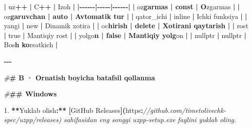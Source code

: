 \documentclass[a4paper,11pt,twoside,openright]{book}
\newenvironment{Shaded}{\begin{snugshade}}{\end{snugshade}}
\newcommand{\CharTok}[1]{\textcolor[rgb]{0.31,0.60,0.02}{#1}}
\newcommand{\CommentTok}[1]{\textcolor[rgb]{0.56,0.35,0.01}{\textit{#1}}}
\newcommand{\ErrorTok}[1]{\textcolor[rgb]{0.64,0.00,0.00}{\textbf{#1}}}
\newcommand{\FloatTok}[1]{\textcolor[rgb]{0.00,0.00,0.81}{#1}}
\newcommand{\NormalTok}[1]{#1}
\newcommand{\OperatorTok}[1]{\textcolor[rgb]{0.81,0.36,0.00}{\textbf{#1}}}
\newcommand{\PreprocessorTok}[1]{\textcolor[rgb]{0.56,0.35,0.01}{\textit{#1}}}
\begin{document}
\begin{Shaded}
\begin{Highlighting}[]
\OperatorTok{|}\NormalTok{ uz}\OperatorTok{++} \OperatorTok{|}\NormalTok{ C}\OperatorTok{++} \OperatorTok{|}\NormalTok{ Izoh }\OperatorTok{|}
\OperatorTok{|{-}{-}{-}{-}{-}{-}|{-}{-}{-}{-}{-}|{-}{-}{-}{-}{-}{-}|}
\OperatorTok{|} \ErrorTok{\textasciigrave{}}\NormalTok{o}\CharTok{\textquotesingle{}z}\ErrorTok{garmas\textasciigrave{} | \textasciigrave{}const\textasciigrave{} | O}\CharTok{\textquotesingle{}}\NormalTok{zgarmas }\OperatorTok{|}
\OperatorTok{|} \ErrorTok{\textasciigrave{}}\NormalTok{o}\CharTok{\textquotesingle{}z}\ErrorTok{garuvchan\textasciigrave{} | \textasciigrave{}auto\textasciigrave{} | Avtomatik tur |}
\OperatorTok{|} \ErrorTok{\textasciigrave{}}\NormalTok{qator\_ichi}\ErrorTok{\textasciigrave{}} \OperatorTok{|} \ErrorTok{\textasciigrave{}}\NormalTok{inline}\ErrorTok{\textasciigrave{}} \OperatorTok{|}\NormalTok{ Ichki funksiya }\OperatorTok{|}
\OperatorTok{|} \ErrorTok{\textasciigrave{}}\NormalTok{yangi}\ErrorTok{\textasciigrave{}} \OperatorTok{|} \ErrorTok{\textasciigrave{}}\NormalTok{new}\ErrorTok{\textasciigrave{}} \OperatorTok{|}\NormalTok{ Dinamik xotira }\OperatorTok{|}
\OperatorTok{|} \ErrorTok{\textasciigrave{}}\NormalTok{o}\CharTok{\textquotesingle{}c}\ErrorTok{hirish\textasciigrave{} | \textasciigrave{}delete\textasciigrave{} | Xotirani qaytarish |}
\OperatorTok{|} \ErrorTok{\textasciigrave{}}\NormalTok{rost}\ErrorTok{\textasciigrave{}} \OperatorTok{|} \ErrorTok{\textasciigrave{}}\NormalTok{true}\ErrorTok{\textasciigrave{}} \OperatorTok{|}\NormalTok{ Mantiqiy rost }\OperatorTok{|}
\OperatorTok{|} \ErrorTok{\textasciigrave{}}\NormalTok{yolg}\CharTok{\textquotesingle{}o}\ErrorTok{n\textasciigrave{} | \textasciigrave{}false\textasciigrave{} | Mantiqiy yolg}\CharTok{\textquotesingle{}}\NormalTok{on }\OperatorTok{|}
\OperatorTok{|} \ErrorTok{\textasciigrave{}}\NormalTok{nullptr}\ErrorTok{\textasciigrave{}} \OperatorTok{|} \ErrorTok{\textasciigrave{}}\NormalTok{nullptr}\ErrorTok{\textasciigrave{}} \OperatorTok{|}\NormalTok{ Bo}\CharTok{\textquotesingle{}s}\ErrorTok{h ko}\CharTok{\textquotesingle{}}\NormalTok{rsatkich }\OperatorTok{|}

\OperatorTok{{-}{-}{-}}

\PreprocessorTok{\#}\ErrorTok{\# B · O\textquotesingle{}rnatish bo\textquotesingle{}yicha batafsil qo\textquotesingle{}llanma}

\PreprocessorTok{\#}\ErrorTok{\#\# Windows}

\FloatTok{1.} \OperatorTok{**}\NormalTok{Yuklab olish}\OperatorTok{:**} \OperatorTok{[}\NormalTok{GitHub Releases}\OperatorTok{](}\NormalTok{https}\OperatorTok{:}\CommentTok{//github.com/timetolivechk{-}spec/uzpp/releases) sahifasidan eng so\textquotesingle{}nggi \textasciigrave{}uzpp{-}setup.exe\textasciigrave{} faylini yuklab oling.}


\end{Highlighting}
\end{Shaded}
\end{document}
